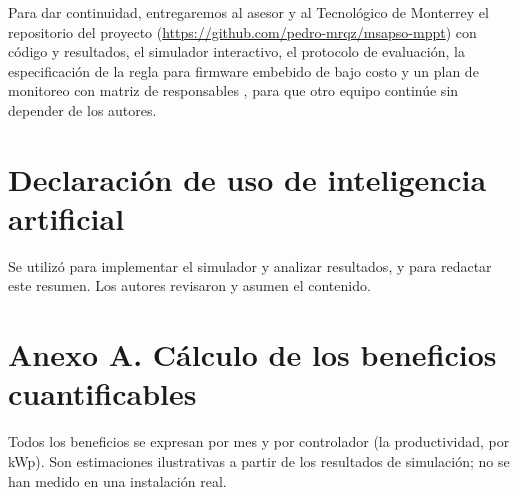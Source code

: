 \documentclass[letterpaper,11pt]{article}
\begin{document}
Para dar continuidad, entregaremos al asesor y al Tecnológico de Monterrey el repositorio del proyecto (\url{https://github.com/pedro-mrqz/msapso-mppt}) con código y resultados, el simulador interactivo, el protocolo de evaluación, la especificación de la regla para firmware embebido de bajo costo \parencite{motahhir2020} y un plan de monitoreo con matriz de responsables \parencite{miller2022}, para que otro equipo continúe sin depender de los autores.

\section*{Declaración de uso de inteligencia artificial}
Se utilizó \textcite{anthropic2026claude} para implementar el simulador y analizar resultados, y \textcite{anthropic2026opus} para redactar este resumen. Los autores revisaron y asumen el contenido.

\printbibliography[title={Referencias}]

\clearpage
\section*{Anexo A. Cálculo de los beneficios cuantificables}
Todos los beneficios se expresan por mes y por controlador (la productividad, por kWp). Son estimaciones ilustrativas a partir de los resultados de simulación; no se han medido en una instalación real.
\end{document}
